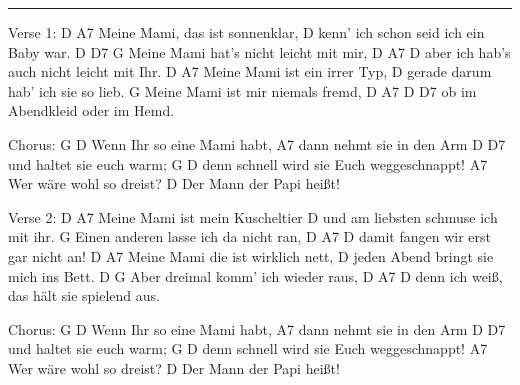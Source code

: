 \noindent\rule{\columnwidth}{1pt}

\begin{multicols}{2}
\begin{lstsong}
Verse 1:
          D                      A7
Meine Mami, das ist sonnenklar,
                                      D
kenn' ich schon seid ich ein Baby war.
 D      D7                      G
Meine Mami hat's nicht leicht mit mir,
D         A7                      D
aber ich hab's auch nicht leicht mit Ihr.
D                       A7
Meine Mami ist ein irrer Typ,
                                     D
gerade darum hab' ich sie so lieb.
                                   G
Meine Mami ist mir niemals fremd,
          D      A7             D    D7
ob im Abendkleid oder im Hemd.

Chorus:
G               D
Wenn Ihr so eine Mami habt,
      A7
dann nehmt sie in den Arm
D                       D7
und haltet sie euch warm;
G                        D
denn schnell wird sie Euch weggeschnappt!
A7
Wer wäre wohl so dreist?
                        D
Der Mann der Papi heißt!

Verse 2:
D                               A7
Meine Mami ist mein Kuscheltier
                                     D
und am liebsten schmuse ich mit ihr.
                                      G
Einen anderen lasse ich da nicht ran,
        D        A7                   D
damit fangen wir erst gar nicht an!
D                                A7
Meine Mami die ist wirklich nett,
                                      D
jeden Abend bringt sie mich ins Bett.
D                                       G
Aber dreimal komm' ich wieder raus,
    D           A7                  D
denn ich weiß, das hält sie spielend aus.

Chorus:
G               D
Wenn Ihr so eine Mami habt,
       A7
dann nehmt sie in den Arm
D                       D7
und haltet sie euch warm;
G                        D
denn schnell wird sie Euch weggeschnappt!
A7
Wer wäre wohl so dreist?
                        D
Der Mann der Papi heißt!
\end{lstsong}
\end{multicols}
\newpage
